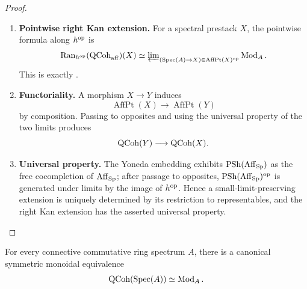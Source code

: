 \begin{proof}
\leavevmode
\begin{enumerate}[label=\textup{(\arabic*)}]
    \item \textbf{Pointwise right Kan extension.}
    For a spectral prestack \(X\), the pointwise formula along
    \(h^{\mathrm{op}}\) is
    \[
        \operatorname{Ran}_{h^{\mathrm{op}}}(\operatorname{QCoh}_{\mathrm{aff}})(X)
        \simeq
        \varprojlim\nolimits_{(\operatorname{Spec}(A)\to X)\in\operatorname{AffPt}(X)^{\mathrm{op}}}\operatorname{Mod}_A.
    \]
    This is exactly .

    \item \textbf{Functoriality.}
    A morphism \(X\to Y\) induces
    \[
        \operatorname{AffPt}(X)\longrightarrow\operatorname{AffPt}(Y)
    \]
    by composition. Passing to opposites and using the universal property of
    the two limits produces
    \[
        \operatorname{QCoh}(Y)\longrightarrow\operatorname{QCoh}(X).
    \]

    \item \textbf{Universal property.}
    The Yoneda embedding exhibits \(\operatorname{PSh}(\operatorname{Aff}_{\operatorname{Sp}})\) as the free
    cocompletion of \(\operatorname{Aff}_{\operatorname{Sp}}\); after passage to opposites,
    \(\operatorname{PSh}(\operatorname{Aff}_{\operatorname{Sp}})^{\mathrm{op}}\) is generated under limits by the image of
    \(h^{\mathrm{op}}\). Hence a small-limit-preserving extension is uniquely determined
    by its restriction to representables, and the right Kan extension has
    the asserted universal property.
\end{enumerate}
\end{proof}

\begin{corollary}
\label{cor:qcoh-recovery-affines}
For every connective commutative ring spectrum $A$, there is a canonical
symmetric monoidal equivalence
\[
    \operatorname{QCoh}(\operatorname{Spec}(A))
    \simeq
    \operatorname{Mod}_A.
\]
\end{corollary}

